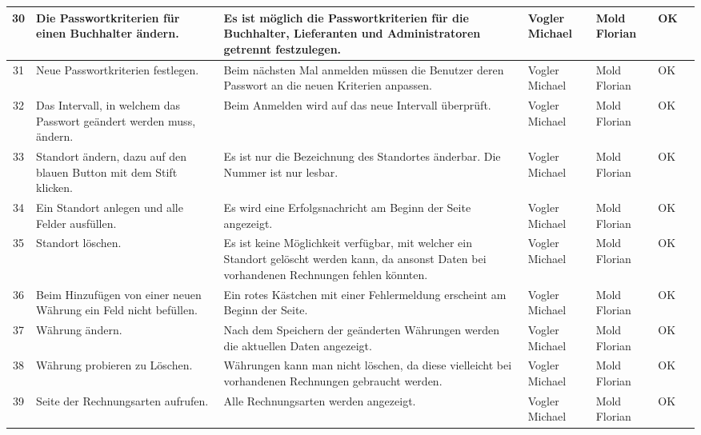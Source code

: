 \begin{longtable}[h]{| c | p{3.7cm} | p{3.8cm} | l | l | l | c |}
30 & Die Passwortkriterien für einen Buchhalter ändern. & Es ist möglich die Passwortkriterien für die Buchhalter, Lieferanten und Administratoren getrennt festzulegen. & Vogler Michael & Mold Florian & OK \\ \hline

31 & Neue Passwortkriterien festlegen. & Beim nächsten Mal anmelden müssen die Benutzer deren Passwort an die neuen Kriterien anpassen. & Vogler Michael & Mold Florian & OK \\ \hline

32 & Das Intervall, in welchem das Passwort geändert werden muss, ändern. & Beim Anmelden wird auf das neue Intervall überprüft. & Vogler Michael & Mold Florian & OK \\ \hline

33 & Standort ändern, dazu auf den blauen Button mit dem Stift klicken. & Es ist nur die Bezeichnung des Standortes änderbar. Die Nummer ist nur lesbar. & Vogler Michael & Mold Florian & OK \\ \hline

34 & Ein Standort anlegen und alle Felder ausfüllen. & Es wird eine Erfolgsnachricht am Beginn der Seite angezeigt. & Vogler Michael & Mold Florian & OK \\ \hline

35 & Standort löschen. & Es ist keine Möglichkeit verfügbar, mit welcher ein Standort gelöscht werden kann, da ansonst Daten bei vorhandenen Rechnungen fehlen könnten. & Vogler Michael & Mold Florian & OK \\ \hline

36 & Beim Hinzufügen von einer neuen Währung ein Feld nicht befüllen. & Ein rotes Kästchen mit einer Fehlermeldung erscheint am Beginn der Seite. & Vogler Michael & Mold Florian & OK \\ \hline

37 & Währung ändern. & Nach dem Speichern der geänderten Währungen werden die aktuellen Daten angezeigt. & Vogler Michael & Mold Florian & OK \\ \hline

38 & Währung probieren zu Löschen. & Währungen kann man nicht löschen, da diese vielleicht bei vorhandenen Rechnungen gebraucht werden. & Vogler Michael & Mold Florian & OK \\ \hline

39 & Seite der Rechnungsarten aufrufen. & Alle Rechnungsarten werden angezeigt. & Vogler Michael & Mold Florian & OK \\ \hline


\end{longtable}
